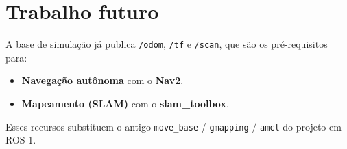 \documentclass[11pt,a4paper]{article}
\begin{document}
\section{Trabalho futuro}

A base de simulação já publica \texttt{/odom}, \texttt{/tf} e \texttt{/scan}, que
são os pré-requisitos para:

\begin{itemize}
  \item \textbf{Navegação autônoma} com o \textbf{Nav2}.
  \item \textbf{Mapeamento (SLAM)} com o \textbf{slam\_toolbox}.
\end{itemize}

\noindent
Esses recursos substituem o antigo \texttt{move\_base} / \texttt{gmapping} /
\texttt{amcl} do projeto em ROS 1.
\end{document}
